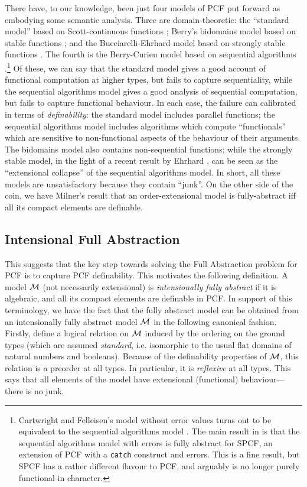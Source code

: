 \documentclass[11pt]{article}
\begin{document}
There have, to our knowledge, been just four models of PCF put forward
as embodying some semantic analysis. Three are domain-theoretic:
the ``standard model'' based on Scott-continuous functions \cite{PlotkinGD:lcfcpl};
Berry's bidomains model based on stable functions \cite{BerryG:modcom};
and the Bucciarelli-Ehrhard model based on strongly stable functions \cite{EhrhardT:extemb}.
The fourth is the Berry-Curien model based on sequential algorithms
\cite{BerryG:seqacd}.\footnote{Cartwright and Felleisen's model without error
values turns out to be equivalent to the sequential algorithms model
\cite{FelleisenM:obsseq,CurienPL:obssac}.
The main result in \cite{FelleisenM:obsseq,CurienPL:obssac} is that
the sequential algorithms model with errors is fully abstract for
SPCF, an extension of PCF with a {\tt catch} construct and errors. This
is a fine result, but SPCF has a rather different flavour to PCF, and
arguably is no longer purely functional in character.}
Of these, we can say that the standard model gives a good account
of functional computation at higher types, but fails to capture
sequentiality, while the sequential algorithms model gives a good
analysis of sequential computation, but fails to capture functional
behaviour. In each case, the failure can calibrated in terms of
{\em definability}: the standard model includes parallel functions;
the sequential algorithms model includes algorithms which compute
``functionals'' which are sensitive to non-functional aspects of the
behaviour of their arguments. The bidomains model also contains
non-sequential functions; while the strongly stable model, in the
light of a recent result by Ehrhard \cite{EhrhardT:prosas}, can be seen as the
``extensional collapse'' of the sequential algorithms model.
In short, all these models are unsatisfactory because they contain ``junk''.
On the other side of the coin, we have Milner's result that an
order-extensional
model is fully-abstract iff all its compact elements are definable.

\subsection*{Intensional Full Abstraction}
This suggests that the key step towards solving the Full Abstraction problem
for PCF is to capture PCF definability.
This motivates the following definition. A model ${\cal M}$
(not necessarily extensional) is {\em intensionally fully abstract}
if it is algebraic, and all its compact elements are definable in PCF.
In support of this terminology, we have the fact that the fully abstract
model can be obtained from an intensionally fully abstract model ${\cal M}$
in the following canonical fashion. Firstly, define a logical relation
on ${\cal M}$ induced by the ordering on the ground types
(which are assumed {\em standard}, i.e. isomorphic to the usual
flat domains of natural numbers and booleans). Because of the
definability properties of ${\cal M}$, this relation is a preorder at
all types.
In particular, it is {\em reflexive} at all types. This says that
all elements of the model have extensional (functional) behaviour---there
is no junk.
\end{document}
